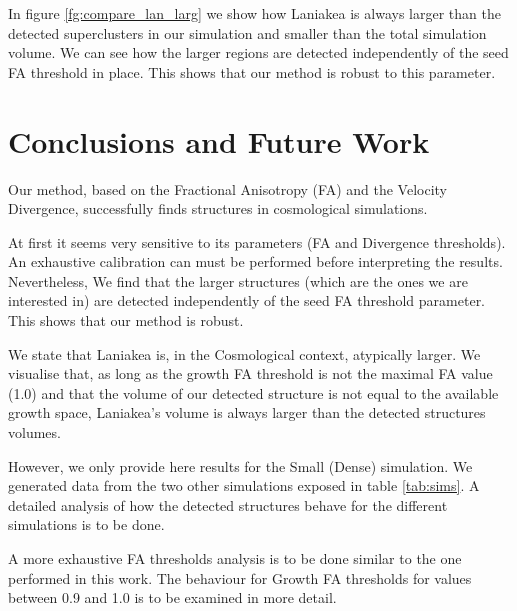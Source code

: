 \documentclass[12pt]{article}
\begin{document}
\begin{par}
In figure \ref{fg:compare_lan_larg} we show how Laniakea is
 always larger than the detected superclusters in our
  simulation and smaller than the total simulation volume. We
   can see how the larger regions are detected independently
    of the seed FA threshold in place. This shows that our
     method is robust to this parameter.
\end{par}



\section{Conclusions and Future Work}
\label{sec:discussions}
\begin{par}
Our method, based on the Fractional Anisotropy (FA) and the Velocity Divergence, successfully finds structures in cosmological simulations. \\
\end{par}

\begin{par}
At first it seems very sensitive to its parameters (FA and
 Divergence thresholds). An exhaustive calibration can must
  be performed before interpreting the results.
Nevertheless, We find that the larger structures (which are
 the ones we are interested in) are detected independently of
  the seed FA threshold parameter. This shows that our method
   is robust.\\
\end{par}
\begin{par}
We state that Laniakea is, in the Cosmological
 context, atypically larger. We visualise that, as
  long as the growth FA threshold is not the
   maximal FA value (1.0) and that the volume of
    our detected structure is not equal to the
     available growth space, Laniakea's volume is
      always larger than the detected structures
       volumes.\\
\end{par}

\begin{par}
However, we only provide here results for the Small (Dense)
 simulation. We generated data from
  the two other simulations exposed in table
   \ref{tab:sims}. A detailed analysis of how the
    detected structures behave for the different
     simulations is to be done.\\
\end{par}

\begin{par}
A more exhaustive FA thresholds analysis is to be
 done similar to the one performed in this work.
  The behaviour for Growth FA thresholds for values
   between 0.9 and 1.0 is to be examined in more
    detail.
\end{par}
\end{document}
